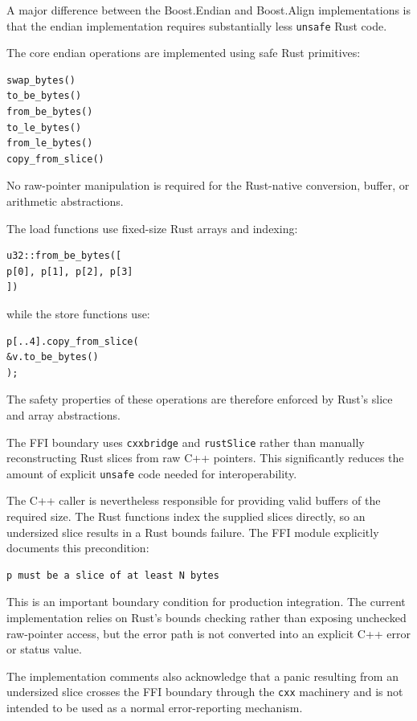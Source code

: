 A major difference between the Boost.Endian and Boost.Align implementations is that the endian implementation requires substantially less 
\texttt{unsafe} Rust code.

The core endian operations are implemented using safe Rust primitives:

\begin{lstlisting}[style=rustblock]
swap_bytes()
to_be_bytes()
from_be_bytes()
to_le_bytes()
from_le_bytes()
copy_from_slice()
\end{lstlisting}

No raw-pointer manipulation is required for the Rust-native conversion, buffer, or arithmetic abstractions.

The load functions use fixed-size Rust arrays and indexing:

\begin{lstlisting}[style=rustblock]
u32::from_be_bytes([
p[0], p[1], p[2], p[3]
])
\end{lstlisting}

while the store functions use:

\begin{lstlisting}[style=rustblock]
p[..4].copy_from_slice(
&v.to_be_bytes()
);
\end{lstlisting}

The safety properties of these operations are therefore enforced by Rust's slice and array abstractions.

The FFI boundary uses \texttt{cxx\:\:bridge} and \texttt{rust\:\:Slice} rather than manually reconstructing Rust slices from raw C++ pointers. 
This significantly reduces the amount of explicit \texttt{unsafe} code needed for interoperability.

The C++ caller is nevertheless responsible for providing valid buffers of the required size. The Rust functions index the supplied slices 
directly, so an undersized slice results in a Rust bounds failure. The FFI module explicitly documents this precondition:

\begin{lstlisting}[style=textblock]
p must be a slice of at least N bytes
\end{lstlisting}

This is an important boundary condition for production integration. The current implementation relies on Rust's bounds checking rather than 
exposing unchecked raw-pointer access, but the error path is not converted into an explicit C++ error or status value.

The implementation comments also acknowledge that a panic resulting from an undersized slice crosses the FFI boundary through the \texttt{cxx} 
machinery and is not intended to be used as a normal error-reporting mechanism.

